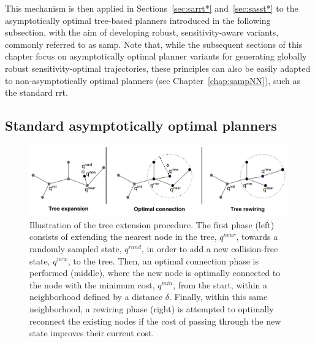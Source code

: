 This mechanism is then applied in Sections~\ref{sec:sarrt*} and~\ref{sec:sasst*} to the asymptotically optimal tree-based planners introduced in the following subsection, with the aim of developing robust, sensitivity-aware variants, commonly referred to as \gls{samp}. 
Note that, while the subsequent sections of this chapter focus on asymptotically optimal planner variants for generating globally robust sensitivity-optimal trajectories, these principles can also be easily adapted to non-asymptotically optimal planners (see Chapter~\ref{chap:sampNN}), such as the standard \gls{rrt}.

\subsection{Standard asymptotically optimal planners}\label{sec:standard_planners}

\begin{figure} [h!]
    \centering
    \includegraphics[width=0.95\linewidth]{figures/samp/rrtstar.png} 
    \caption{Illustration of the  tree extension procedure.
    The first phase (left) consists of extending the nearest node in the tree, $q^{near}$, towards a randomly sampled state, $q^{rand}$, in order to add a new collision-free state, $q^{new}$, to the tree.
    Then, an optimal connection phase is performed (middle), where the new node is optimally connected to the node with the minimum cost, $q^{min}$, from the start, within a neighborhood defined by a distance $\delta$.
    Finally, within this same neighborhood, a rewiring phase (right) is attempted to optimally reconnect the existing nodes if the cost of passing through the new state improves their current cost.}%
    \label{fig:rrtstar}%
\end{figure}

